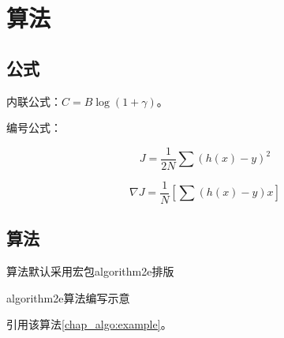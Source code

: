 \chapter{算法}

\section{公式}

内联公式：$C = B\log(1 + \gamma)$。

编号公式：

\begin{equation}
J = \frac{1}{2N}\sum(h(x) - y)^2
\end{equation}

\begin{equation}
\nabla J = \frac{1}{N}[\sum(h(x) - y)x]
\end{equation}

\section{算法}

\begin{algorithm}[!htb]
	算法默认采用宏包algorithm2e排版\;
	\BlankLine
	 {
	}
	\caption{algorithm2e算法编写示意}
	\label{chap_algo:example}
\end{algorithm}

引用该算法\ref*{chap_algo:example}。